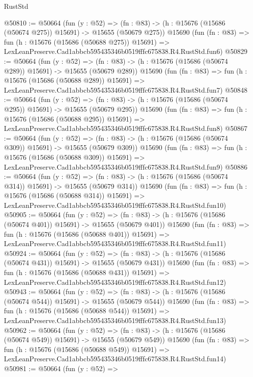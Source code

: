 \begin{lexlean}{RustStd}
\begin{coremodule}
@50810 := @50664
    (fun (y : @52) =>
    (fn : @83) -> (h : @15676 (@15686 (@50674 @275)) @15691) -> @15655 (@50679 @275))
    @15690
    (fun (fn : @83) =>
    fun (h : @15676 (@15686 (@50688 @275)) @15691) =>
    LexLeanPreserve.Cad1abbcb595435346b0519fffc675838.R4.RustStd.fun6)
@50829 := @50664
    (fun (y : @52) =>
    (fn : @83) -> (h : @15676 (@15686 (@50674 @289)) @15691) -> @15655 (@50679 @289))
    @15690
    (fun (fn : @83) =>
    fun (h : @15676 (@15686 (@50688 @289)) @15691) =>
    LexLeanPreserve.Cad1abbcb595435346b0519fffc675838.R4.RustStd.fun7)
@50848 := @50664
    (fun (y : @52) =>
    (fn : @83) -> (h : @15676 (@15686 (@50674 @295)) @15691) -> @15655 (@50679 @295))
    @15690
    (fun (fn : @83) =>
    fun (h : @15676 (@15686 (@50688 @295)) @15691) =>
    LexLeanPreserve.Cad1abbcb595435346b0519fffc675838.R4.RustStd.fun8)
@50867 := @50664
    (fun (y : @52) =>
    (fn : @83) -> (h : @15676 (@15686 (@50674 @309)) @15691) -> @15655 (@50679 @309))
    @15690
    (fun (fn : @83) =>
    fun (h : @15676 (@15686 (@50688 @309)) @15691) =>
    LexLeanPreserve.Cad1abbcb595435346b0519fffc675838.R4.RustStd.fun9)
@50886 := @50664
    (fun (y : @52) =>
    (fn : @83) -> (h : @15676 (@15686 (@50674 @314)) @15691) -> @15655 (@50679 @314))
    @15690
    (fun (fn : @83) =>
    fun (h : @15676 (@15686 (@50688 @314)) @15691) =>
    LexLeanPreserve.Cad1abbcb595435346b0519fffc675838.R4.RustStd.fun10)
@50905 := @50664
    (fun (y : @52) =>
    (fn : @83) -> (h : @15676 (@15686 (@50674 @401)) @15691) -> @15655 (@50679 @401))
    @15690
    (fun (fn : @83) =>
    fun (h : @15676 (@15686 (@50688 @401)) @15691) =>
    LexLeanPreserve.Cad1abbcb595435346b0519fffc675838.R4.RustStd.fun11)
@50924 := @50664
    (fun (y : @52) =>
    (fn : @83) -> (h : @15676 (@15686 (@50674 @431)) @15691) -> @15655 (@50679 @431))
    @15690
    (fun (fn : @83) =>
    fun (h : @15676 (@15686 (@50688 @431)) @15691) =>
    LexLeanPreserve.Cad1abbcb595435346b0519fffc675838.R4.RustStd.fun12)
@50943 := @50664
    (fun (y : @52) =>
    (fn : @83) -> (h : @15676 (@15686 (@50674 @544)) @15691) -> @15655 (@50679 @544))
    @15690
    (fun (fn : @83) =>
    fun (h : @15676 (@15686 (@50688 @544)) @15691) =>
    LexLeanPreserve.Cad1abbcb595435346b0519fffc675838.R4.RustStd.fun13)
@50962 := @50664
    (fun (y : @52) =>
    (fn : @83) -> (h : @15676 (@15686 (@50674 @549)) @15691) -> @15655 (@50679 @549))
    @15690
    (fun (fn : @83) =>
    fun (h : @15676 (@15686 (@50688 @549)) @15691) =>
    LexLeanPreserve.Cad1abbcb595435346b0519fffc675838.R4.RustStd.fun14)
@50981 := @50664
    (fun (y : @52) =>

\end{coremodule}
\end{lexlean}
